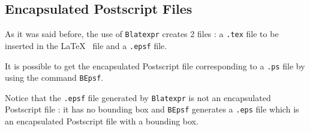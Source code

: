 \subsection{Encapsulated Postscript Files}
As it was said before, the use of {\tt Blatexpr} creates 2 files : a 
{\tt .tex} file to be inserted in the \LaTeX~ file and a {\tt .epsf} file.

It is possible to get the encapsulated Postscript file corresponding to a 
{\tt .ps} file by using the command {\tt BEpsf}.

Notice that the {\tt .epsf} file generated by {\tt Blatexpr} is not an 
encapsulated Postscript file : it has no bounding box and {\tt BEpsf}
generates a {\tt .eps} file which is an encapsulated Postscript file with 
a bounding box.
